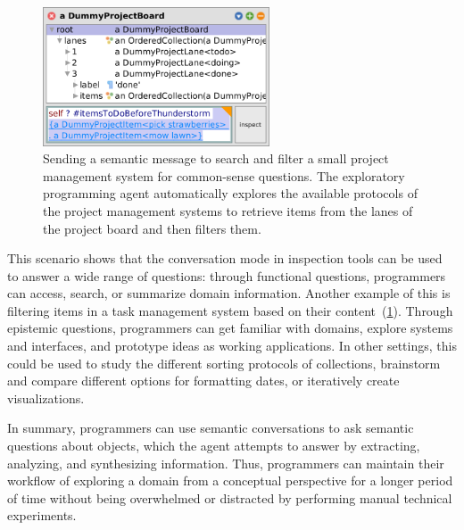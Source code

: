 \begin{figure}
	\centering
	\includegraphics[width=0.6\textwidth]{chapters/08_application/02_conversation/project.png}
	\caption[Sending a semantic message to search and filter a small project management system for common-sense questions.]{
		Sending a semantic message to search and filter a small project management system for common-sense questions.
		The exploratory programming agent automatically explores the available protocols of the project management systems to retrieve items from the lanes of the project board and then filters them.
	}
	\label{fig:application/conversation/project}
\end{figure}

This scenario shows that the conversation mode in inspection tools can be used to answer a wide range of questions:
through functional questions, programmers can access, search, or summarize domain information.
Another example of this is filtering items in a task management system based on their content~(\cref{fig:application/conversation/project}).
Through epistemic questions, programmers can get familiar with domains, explore systems and interfaces, and prototype ideas as working applications.
In other settings, this could be used to study the different sorting protocols of collections, brainstorm and compare different options for formatting dates, or iteratively create visualizations.

In summary, programmers can use semantic conversations to ask semantic questions about objects, which the agent attempts to answer by extracting, analyzing, and synthesizing information.
Thus, programmers can maintain their workflow of exploring a domain from a conceptual perspective for a longer period of time without being overwhelmed or distracted by performing manual technical experiments.
